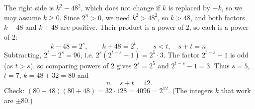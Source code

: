 The right side is $k^2-48^2$, which does not change if $k$ is replaced by $-k$, so we may assume $k\ge0$. Since $2^n>0$, we need $k^2>48^2$, so $k>48$, and both factors $k-48$ and $k+48$ are positive. Their product is a power of $2$, so each is a power of $2$:
\[k-48=2^s,\qquad k+48=2^t,\qquad s<t,\quad s+t=n .\]
Subtracting, $2^t-2^s=96$, i.e. $2^s\left(2^{t-s}-1\right)=2^5\cdot3$. The factor $2^{t-s}-1$ is odd (as $t>s$), so comparing powers of $2$ gives $2^s=2^5$ and $2^{t-s}-1=3$. Thus $s=5$, $t=7$, $k=48+32=80$ and
\[n=s+t=\boxed{12}.\]
Check: $(80-48)(80+48)=32\cdot128=4096=2^{12}$. (The integers $k$ that work are $\pm80$.)
